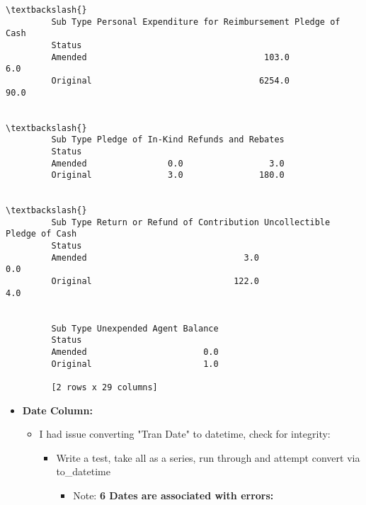 \documentclass[11pt]{article}
\providecommand{\tightlist}{%
      \setlength{\itemsep}{0pt}\setlength{\parskip}{0pt}}
\begin{document}
\begin{Verbatim}[commandchars=\\\{\}]
                                                                         \textbackslash{}
         Sub Type Personal Expenditure for Reimbursement Pledge of Cash   
         Status                                                           
         Amended                                   103.0            6.0   
         Original                                 6254.0           90.0   
         
                                                         \textbackslash{}
         Sub Type Pledge of In-Kind Refunds and Rebates   
         Status                                           
         Amended                0.0                 3.0   
         Original               3.0               180.0   
         
                                                                                 \textbackslash{}
         Sub Type Return or Refund of Contribution Uncollectible Pledge of Cash   
         Status                                                                   
         Amended                               3.0                          0.0   
         Original                            122.0                          4.0   
         
                                            
         Sub Type Unexpended Agent Balance  
         Status                             
         Amended                       0.0  
         Original                      1.0  
         
         [2 rows x 29 columns]
\end{Verbatim}
            
    \begin{itemize}
\tightlist
\item
  \textbf{Date Column:}

  \begin{itemize}
  \tightlist
  \item
    I had issue converting "Tran Date" to datetime, check for integrity:

    \begin{itemize}
    \tightlist
    \item
      Write a test, take all as a series, run through and attempt
      convert via to\_datetime

      \begin{itemize}
      \tightlist
      \item
        Note: \textbf{6 Dates are associated with errors:}
      \end{itemize}
    \end{itemize}
  \end{itemize}
\end{itemize}
\end{document}
